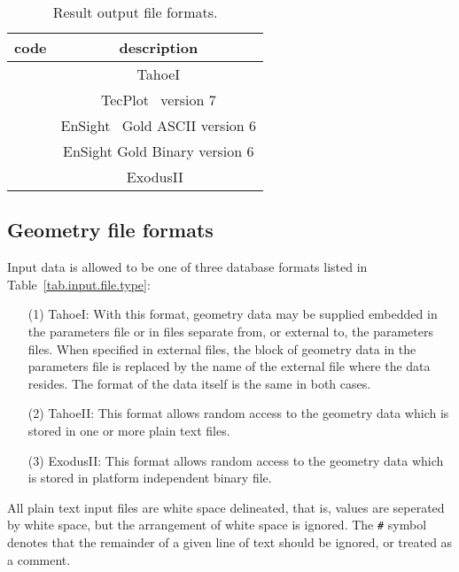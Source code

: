 \begin{table}[h]
\caption{\label{tab.output.file.type} Result output file formats.}
\begin{center}
\begin{tabular}[c]{|c|c|}
\hline
 \parbox[c]{0.75in}{\centering \textbf{code}}
&\parbox[c]{2.0in}{\raggedright \textbf{description}}\\
\hline
\parbox[c]{0.75in}{} & 
\parbox[c]{2.0in}{\raggedright TahoeI}\\
\hline
\parbox[c]{0.75in}{}  & 
\parbox[c]{2.0in}{\raggedright \textsf{TecPlot}~\cite{TecPlot8} version 7}\\
\hline
\parbox[c]{0.75in}{}  & 
\parbox[c]{2.0in}{\raggedright \vspace{2pt} \textsf{EnSight}~\cite{EnSight6} Gold ASCII 
version 6 \vspace{2pt}}\\
\hline
\parbox[c]{0.75in}{}  & 
\parbox[c]{2.0in}{\raggedright \vspace{2pt} \textsf{EnSight} Gold 
Binary version 6 \vspace{2pt}}\\
\hline
\parbox[c]{0.75in}{}  & 
\parbox[c]{2.0in}{\raggedright \textsf{ExodusII}~\cite{ExodusII}}\\
\hline
\end{tabular}
\end{center}
\end{table}

\subsection{Geometry file formats}
\label{sect.file.geometry}
Input data is allowed to be one of three database formats listed in
Table~\ref{tab.input.file.type}: 
\begin{itemize}
\item[(1)] TahoeI: With this format, geometry data may be supplied 
embedded in the parameters file or in files separate from, or external 
to, the parameters files. When specified in external files, the block 
of geometry data in the parameters file is replaced by the name of 
the external file where the data resides. The format of the data 
itself is the same in both cases.
\item[(2)] TahoeII: This format allows random access to the geometry 
data which is stored in one or more plain text files.
\item[(3)] \textsf{ExodusII}: 
This format allows random access to the geometry 
data which is stored in platform independent binary file.
\end{itemize}
All \tahoe plain text input files are white space delineated, that is, 
values are seperated by white space, but the arrangement of white space
is ignored.
The \texttt{\#} symbol denotes that the remainder of a given line of text 
should be ignored, or treated as a comment.

